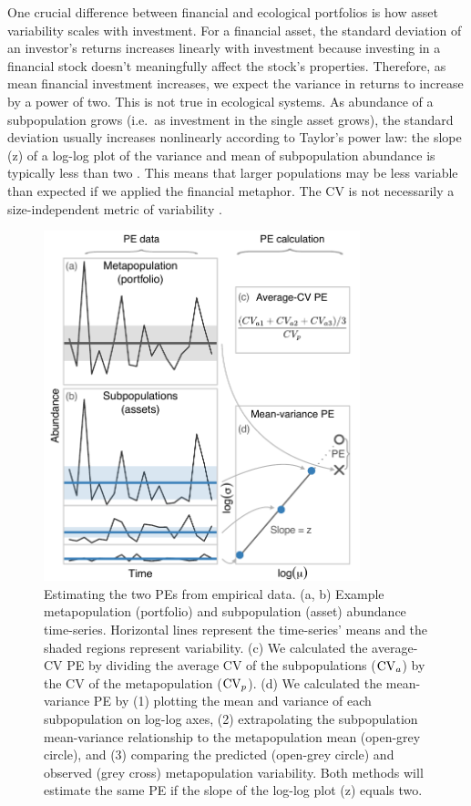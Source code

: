 One crucial difference between financial and ecological portfolios is how asset
variability scales with investment. For a financial asset, the standard
deviation of an investor's returns increases linearly with investment because
investing in a financial stock doesn't meaningfully affect the stock's
properties. Therefore, as mean financial investment increases, we expect the
variance in returns to increase by a power of two. This is not true in
ecological systems. As abundance of a subpopulation grows (i.e.\ as investment
in the single asset grows), the standard deviation usually increases
nonlinearly according to Taylor's power law: the slope (z) of a log-log plot of
the variance and mean of subpopulation abundance is typically less than two
\citep{taylor1980,taylor1982}. This means that larger populations may
be less variable than expected if we applied the financial metaphor. The
CV is not necessarily a size-independent metric of variability
\citep{mcardle1990}.

\begin{figure}[htbp]
  \centering
  \includegraphics[height=4in]{prophets/fig1}
  \caption[Estimating the two PEs from empirical data.]{
  Estimating the two PEs from empirical data. (a, b) Example
    metapopulation (portfolio) and subpopulation (asset) abundance time-series.
    Horizontal lines represent the time-series' means and the shaded regions
    represent variability. (c) We calculated the average-CV PE by dividing the
    average CV of the subpopulations ($\mathrm{CV}_a$) by the CV of the metapopulation
    ($\mathrm{CV}_p$). (d) We calculated the mean-variance PE by (1) plotting the mean
    and variance of each subpopulation on log-log axes, (2) extrapolating the
    subpopulation mean-variance relationship to the metapopulation mean
    (open-grey circle), and (3) comparing the predicted (open-grey circle) and
    observed (grey cross) metapopulation variability. Both methods will
    estimate the same PE if the slope of the log-log plot (z) equals two.
  }
  \label{fig:didacticPE}
\end{figure}

